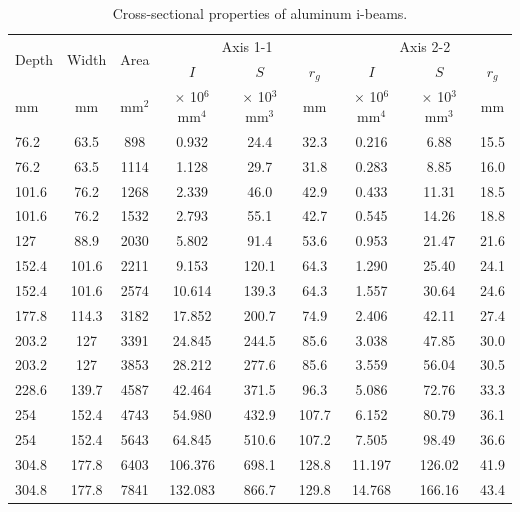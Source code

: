 \documentclass[
10pt,
a4paper,
openany,
svgnames,
]{book}
\begin{document}
\begin{table}[H]
  \centering
  \caption{Cross-sectional properties of aluminum i-beams.}
  \label{tab: alum i-beams}
  \begin{tabular}{lcccccccc}
    \multirow{2}{1.5cm}{Depth} & \multirow{2}{1.5cm}{Width} & \multirow{2}{1.5cm}{Area} & \multicolumn{3}{c}{Axis 1-1} & \multicolumn{3}{c}{Axis 2-2} \\
    \cmidrule{4-9}
                             & & & $I$ & $S$ & $r_g$ & $I$ & $S$ & $r_g$ \\
    \midrule
    mm & mm & mm$^2$ & $\times$ 10$^6$ mm$^4$ & $\times$ 10$^3$ mm$^3$ & mm & $\times$ 10$^6$ mm$^4$ & $\times$ 10$^3$ mm$^3$ & mm \\
    \midrule
    76.2  & 63.5  & 898  & 0.932   & 24.4  & 32.3  & 0.216  & 6.88   & 15.5 \\
    76.2  & 63.5  & 1114 & 1.128   & 29.7  & 31.8  & 0.283  & 8.85   & 16.0 \\
    \rowcolor{LightSkyBlue!50}
    101.6 & 76.2  & 1268 & 2.339   & 46.0  & 42.9  & 0.433  & 11.31  & 18.5 \\
    \rowcolor{LightSkyBlue!50}
    101.6 & 76.2  & 1532 & 2.793   & 55.1  & 42.7  & 0.545  & 14.26  & 18.8 \\
    127   & 88.9  & 2030 & 5.802   & 91.4  & 53.6  & 0.953  & 21.47  & 21.6 \\
    \rowcolor{LightSkyBlue!50}
    152.4 & 101.6 & 2211 & 9.153   & 120.1 & 64.3  & 1.290  & 25.40  & 24.1 \\
    \rowcolor{LightSkyBlue!50}
    152.4 & 101.6 & 2574 & 10.614  & 139.3 & 64.3  & 1.557  & 30.64  & 24.6 \\
    177.8 & 114.3 & 3182 & 17.852  & 200.7 & 74.9  & 2.406  & 42.11  & 27.4 \\
    \rowcolor{LightSkyBlue!50}
    203.2 & 127   & 3391 & 24.845  & 244.5 & 85.6  & 3.038  & 47.85  & 30.0 \\
    \rowcolor{LightSkyBlue!50}
    203.2 & 127   & 3853 & 28.212  & 277.6 & 85.6  & 3.559  & 56.04  & 30.5 \\
    228.6 & 139.7 & 4587 & 42.464  & 371.5 & 96.3  & 5.086  & 72.76  & 33.3 \\
    \rowcolor{LightSkyBlue!50}
    254   & 152.4 & 4743 & 54.980  & 432.9 & 107.7 & 6.152  & 80.79  & 36.1 \\
    \rowcolor{LightSkyBlue!50}
    254   & 152.4 & 5643 & 64.845  & 510.6 & 107.2 & 7.505  & 98.49  & 36.6 \\
    304.8 & 177.8 & 6403 & 106.376 & 698.1 & 128.8 & 11.197 & 126.02 & 41.9 \\
    304.8 & 177.8 & 7841 & 132.083 & 866.7 & 129.8 & 14.768 & 166.16 & 43.4 \\
    \bottomrule
  \end{tabular}
\end{table}
\end{document}
